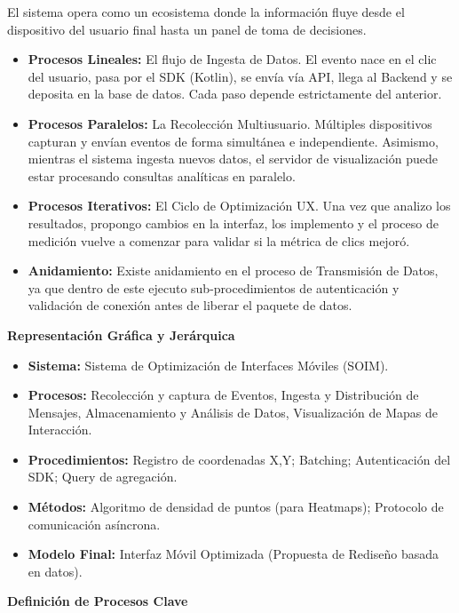 \documentclass[final,3p,times]{elsarticle}
\begin{document}
El sistema opera como un ecosistema donde la información fluye desde el dispositivo del usuario final hasta un panel de toma de decisiones.

\begin{itemize}
    \item \textbf{Procesos Lineales:} El flujo de Ingesta de Datos. El evento nace en el clic del usuario, pasa por el SDK (Kotlin), se envía vía API, llega al Backend y se deposita en la base de datos. Cada paso depende estrictamente del anterior.
    \item \textbf{Procesos Paralelos:} La Recolección Multiusuario. Múltiples dispositivos capturan y envían eventos de forma simultánea e independiente. Asimismo, mientras el sistema ingesta nuevos datos, el servidor de visualización puede estar procesando consultas analíticas en paralelo.
    \item \textbf{Procesos Iterativos:} El Ciclo de Optimización UX. Una vez que analizo los resultados, propongo cambios en la interfaz, los implemento y el proceso de medición vuelve a comenzar para validar si la métrica de clics mejoró.
    \item \textbf{Anidamiento:} Existe anidamiento en el proceso de Transmisión de Datos, ya que dentro de este ejecuto sub-procedimientos de autenticación y validación de conexión antes de liberar el paquete de datos.
\end{itemize}

\vspace{0.5cm}
\noindent\textbf{Representación Gráfica y Jerárquica}

\begin{itemize}
    \item \textbf{Sistema:} Sistema de Optimización de Interfaces Móviles (SOIM).
    \item \textbf{Procesos:} Recolección y captura de Eventos, Ingesta y Distribución de Mensajes, Almacenamiento y Análisis de Datos, Visualización de Mapas de Interacción.
    \item \textbf{Procedimientos:} Registro de coordenadas X,Y; Batching; Autenticación del SDK; Query de agregación.
    \item \textbf{Métodos:} Algoritmo de densidad de puntos (para Heatmaps); Protocolo de comunicación asíncrona.
    \item \textbf{Modelo Final:} Interfaz Móvil Optimizada (Propuesta de Rediseño basada en datos).
\end{itemize}

\vspace{0.5cm}
\noindent\textbf{Definición de Procesos Clave}
\end{document}
